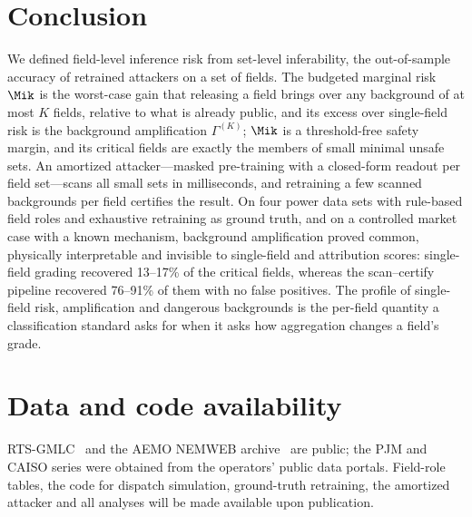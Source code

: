 \section{Conclusion}\label{sec:conclusion}

We defined field-level inference risk from set-level inferability, the out-of-sample accuracy of
retrained attackers on a set of fields. The budgeted marginal risk $\Mik$ is the worst-case gain
that releasing a field brings over any background of at most $K$ fields, relative to what is
already public, and its excess over single-field risk is the background amplification $\Gamma^{(K)}$;
$\Mik$ is a threshold-free safety margin, and its critical fields are exactly the
members of small minimal unsafe sets. An amortized attacker---masked pre-training with a
closed-form readout per field set---scans all small sets in milliseconds, and retraining a few
scanned backgrounds per field certifies the result. On four power data sets with rule-based field
roles and exhaustive retraining as ground truth, and on a controlled market case with a known
mechanism, background amplification proved common, physically interpretable and invisible to
single-field and attribution scores: single-field grading recovered 13--17\% of the critical fields,
whereas the scan--certify pipeline recovered 76--91\% of them with no false positives. The profile of
single-field risk, amplification and dangerous backgrounds is the per-field quantity a
classification standard asks for when it asks how aggregation changes a field's grade.

\section*{Data and code availability}
RTS-GMLC~\cite{barrows2020rts} and the AEMO NEMWEB archive~\cite{aemo2024nemweb} are public; the PJM and CAISO series
were obtained from the operators' public data portals. Field-role tables, the code for dispatch simulation, ground-truth
retraining, the amortized attacker and all analyses will be made available upon publication.
